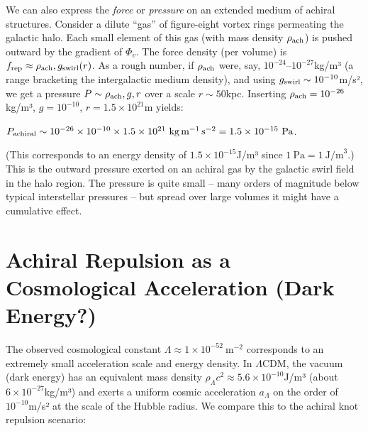 We can also express the \textit{force} or \textit{pressure} on an extended medium of achiral structures. Consider a dilute “gas” of figure-eight vortex rings permeating the galactic halo. Each small element of this gas (with mass density $\rho_{\rm ach}$) is pushed outward by the gradient of $\Phi_v$. The force density (per volume) is $f_{\rm rep} \approx \rho_{\rm ach}, g_{\rm swirl}(r)$.  As a rough number, if $\rho_{\rm ach}$ were, say, $10^{-24}$–$10^{-27}$kg/m³ (a range bracketing the intergalactic medium density), and using $g_{\rm swirl}\sim10^{-10}$m/s², we get a pressure $P \sim \rho_{\rm ach},g,r$ over a scale $r\sim50$kpc. Inserting $\rho_{\rm ach}=10^{-26}$kg/m³, $g=10^{-10}$, $r=1.5\times10^{21}$m yields:


$P_{\rm achiral} \sim 10^{-26}\times10^{-10}\times1.5\times10^{21}~\text{kg}\,\text{m}^{-1}\,\text{s}^{-2} = 1.5\times10^{-15}~\text{Pa}$.


(This corresponds to an energy density of $1.5\times10^{-15}$J/m³ since $1~\text{Pa}=1~\text{J/m}^3$.) This is the outward pressure exerted on an achiral gas by the galactic swirl field in the halo region. The pressure is quite small – many orders of magnitude below typical interstellar pressures – but spread over large volumes it might have a cumulative effect.


\section*{Achiral Repulsion as a Cosmological Acceleration (Dark Energy?)}

The observed cosmological constant $\Lambda \approx 1\times10^{-52}~\text{m}^{-2}$ corresponds to an extremely small acceleration scale and energy density. In $\Lambda$CDM, the vacuum (dark energy) has an equivalent mass density $\rho_\Lambda c^2 \approx 5.6\times10^{-10}$J/m³ (about $6\times10^{-27}$kg/m³) and exerts a uniform cosmic acceleration $a_\Lambda$ on the order of $10^{-10}$m/s² at the scale of the Hubble radius. We compare this to the achiral knot repulsion scenario:


